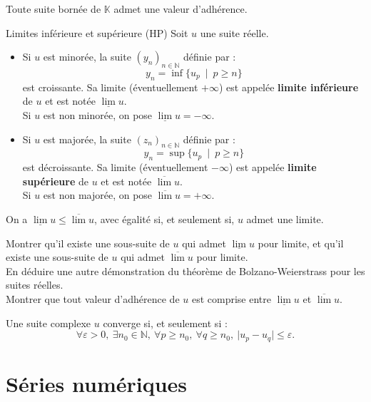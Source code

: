 \documentclass[french]{article}
\newcommand{\N}{\mathbb{N}}
\newcommand{\K}{\mathbb{K}}
\theoremstyle{plain}
\theoremstyle{definition}
\theoremstyle{remark}
\begin{document}
\begin{thm}%
	Toute suite bornée de $\K$ admet une valeur d'adhérence.
\end{thm}

\begin{dfn}{Limites inférieure et supérieure (HP)}
	Soit $u$ une suite réelle.
	\begin{itemize}
		\item Si $u$ est minorée, la suite $(y_n)_{n\in\N}$ définie par : $$y_n=\inf\{u_p\ \mid\ p\geqslant n\}$$ est croissante. Sa limite (éventuellement $+\infty$) est appelée \textbf{limite inférieure} de $u$ et est notée $\underline{\lim}u$. \\
		Si $u$ est non minorée, on pose $\underline{\lim}u=-\infty$.
		\item Si $u$ est majorée, la suite $(z_n)_{n\in\N}$ définie par : $$y_n=\sup\{u_p\ \mid\ p\geqslant n\}$$ est décroissante. Sa limite (éventuellement $-\infty$) est appelée \textbf{limite supérieure} de $u$ et est notée $\overline{\lim}u$.\\
		Si $u$ est non majorée, on pose $\overline{\lim}u=+\infty$.
	\end{itemize}
\end{dfn}

\begin{prop}[HP]%
	On a $\underline{\lim}u\leqslant\overline{\lim}u$, avec égalité si, et seulement si, $u$ admet une limite.
\end{prop}

\begin{exo}
	Montrer qu'il existe une sous-suite de $u$ qui admet $\underline{\lim}u$ pour limite, et qu'il existe une sous-suite de $u$ qui admet $\overline{\lim}u$ pour limite. \\
	En déduire une autre démonstration du théorème de Bolzano-Weierstrass pour les suites réelles. \\
	Montrer que tout valeur d'adhérence de $u$ est comprise entre $\underline{\lim}u$ et $\overline{\lim}u$.
\end{exo}

\begin{thm}
	Une suite complexe $u$ converge si, et seulement si : $$\forall\varepsilon>0,\ \exists n_0\in\N,\ \forall p\geqslant n_0,\ \forall q\geqslant n_0,\ \lvert u_p-u_q\rvert\leqslant\varepsilon.$$
\end{thm}

\section{Séries numériques}
\end{document}
